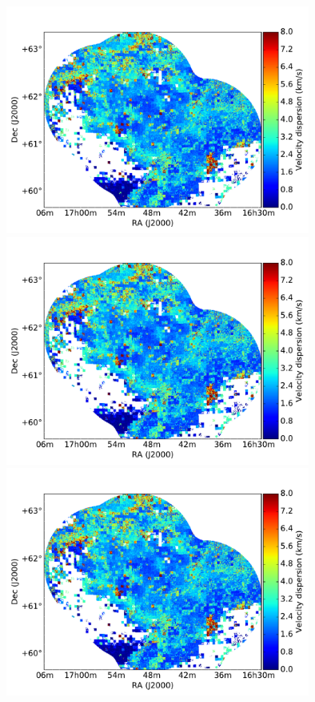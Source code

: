 \documentclass[traditabstract]{aa}
\begin{document}
\begin{figure}[h]
  \centering
  \includegraphics[page=1,height=7.5cm,trim=45 5 65 35,clip=true]{Figures/DHIGLS_disp.pdf}
  \hspace{3mm}
  \includegraphics[page=4,height=7.5cm,trim=45 5 65 35,clip=true]{Figures/DHIGLS_disp.pdf} \\
  \vspace{3mm}
  \includegraphics[page=2,height=7.5cm,trim=45 5 65 35,clip=true]{Figures/DHIGLS_disp.pdf}

\end{figure}
\end{document}
